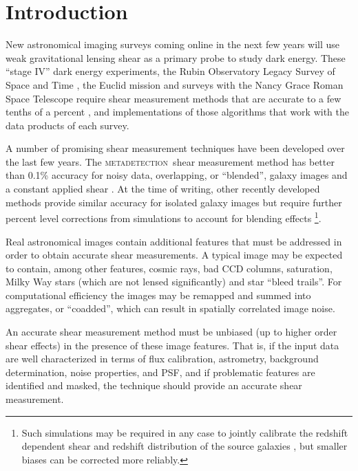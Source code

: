 \documentclass[twocolumn,twocolappendix,astrosym]{openjournal}
\newcommand{\mdet}{\textsc{metadetection}}
\begin{document}
\section{Introduction} \label{sec:intro}

New astronomical imaging surveys coming online in the next few years will use
weak gravitational lensing shear as a primary probe to study dark energy.
These ``stage IV'' dark energy experiments, the Rubin Observatory Legacy Survey
of Space and Time \citep[LSST,][]{IvezicLSST2008}, the Euclid mission
\citep{Euclid2011} and surveys with the Nancy Grace Roman Space Telescope
\citep{Roman2015,AkesonRoman2019} require shear measurement methods that are
accurate to a few tenths of a percent \citep{Massey2013,SRD}, and
implementations of those algorithms that work with the data products of each
survey.

A number of promising shear measurement techniques have been developed over the
last few years.  The \mdet\ shear measurement method \citep{mdet20} has better
than 0.1\% accuracy for noisy data, overlapping, or ``blended'', galaxy images
and a constant applied shear
\citep{mdet20,HoekstraMdet2021a,HoekstraMdet2021b}.  At the time of writing,
other recently developed methods provide similar accuracy for isolated galaxy
images \citep{BernBFD2016, LiFPFSBlending2022} but require further percent
level corrections from simulations to account for blending effects
\citep{mdet20,LiFPFSBlending2022}\footnote{Such simulations may be required in
any case to jointly calibrate the redshift dependent shear and redshift
distribution of the source galaxies \citep{MacCrann2022,LiNofz2022}, but
smaller biases can be corrected more reliably.}.

Real astronomical images contain additional features that must be addressed in
order to obtain accurate shear measurements.  A typical image may be expected
to contain, among other features, cosmic rays, bad CCD columns, saturation,
Milky Way stars (which are not lensed significantly) and star ``bleed trails''.
For computational efficiency the images may be remapped and summed into
aggregates, or ``coadded'', which can result in spatially correlated image
noise.

An accurate shear measurement method must be unbiased (up to higher order shear
effects) in the presence of these image features.  That is, if the input data
are well characterized in terms of flux calibration, astrometry, background
determination, noise properties, and PSF, and if problematic features are
identified and masked, the technique should provide an accurate shear
measurement.
\end{document}
